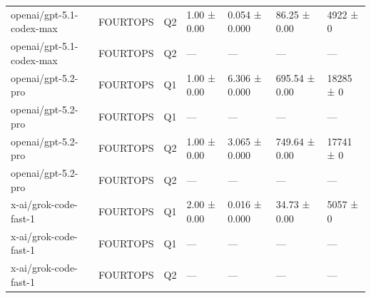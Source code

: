 \begin{table}
\begin{tabular}{lllllll}
openai/gpt-5.1-codex-max & FOURTOPS & Q2 & 1.00 ± 0.00 & 0.054 ± 0.000 & 86.25 ± 0.00 & 4922 ± 0 \\
openai/gpt-5.1-codex-max & FOURTOPS & Q2 & — & — & — & — \\
openai/gpt-5.2-pro & FOURTOPS & Q1 & 1.00 ± 0.00 & 6.306 ± 0.000 & 695.54 ± 0.00 & 18285 ± 0 \\
openai/gpt-5.2-pro & FOURTOPS & Q1 & — & — & — & — \\
openai/gpt-5.2-pro & FOURTOPS & Q2 & 1.00 ± 0.00 & 3.065 ± 0.000 & 749.64 ± 0.00 & 17741 ± 0 \\
openai/gpt-5.2-pro & FOURTOPS & Q2 & — & — & — & — \\
x-ai/grok-code-fast-1 & FOURTOPS & Q1 & 2.00 ± 0.00 & 0.016 ± 0.000 & 34.73 ± 0.00 & 5057 ± 0 \\
x-ai/grok-code-fast-1 & FOURTOPS & Q1 & — & — & — & — \\
x-ai/grok-code-fast-1 & FOURTOPS & Q2 & — & — & — & — \\
\bottomrule
\end{tabular}
\end{table}
